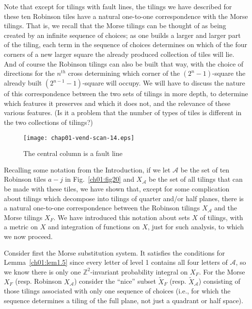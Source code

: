 \documentclass[reqno]{stml-l}
\theoremstyle{plain}
\theoremstyle{definition}
\numberwithin{equation}{chapter}
\begin{document}
Note that except for tilings with fault lines, the tilings we have described for these ten Robinson tiles have a natural one-to-one correspondence with the Morse tilings. That is, we recall that the Morse tilings can be thought of as being created by an infinite sequence of choices; as one builds a larger and larger part of the tiling, each term in the sequence of choices determines on which of the four corners of a new larger square the already produced collection of tiles will lie. And of course the Robinson tilings can also be built that way, with the choice of directions for the $n^{th}$ cross determining which corner of the $(2^{n}-1)$-square the already built $(2^{n-1}-1)$-square will occupy. We will have to discuss the nature of this correspondence between the two sets of tilings in more depth, to determine which features it
preserves and which it does not, and the relevance of these various features. (Is it a problem that the number of types of tiles is different in the two collections of tilings?)

\begin{figure}[h]
\texttt{[image: chap01-vend-scan-14.eps]}
\caption{The central column is a fault line }
\label{ch01:fig27}
\end{figure}

Recalling some notation from the Introduction, if we let $\mathcal{A}$ be the set of ten Robinson tiles $a-j$ in Fig.~\ref{ch01:fig20} and $X_{\mathcal{A}}$ be the set of all tilings that can be made with these tiles, we have shown that, except for some complication about tilings which decompose into tilings of quarter and/or half planes, there is a natural one-to-one correspondence between the Robinson tilings $X_{\mathcal{A}}$ and the Morse tilings $X_{F}$. We have introduced this notation about sets $X$ of tilings, with a metric on $X$ and integration of functions on $X$, just for such analysis, to which we now proceed.

Consider first the Morse substitution system. It satisfies the conditions for Lemma~\ref{ch01:lem1.5} since every letter of level 1 contains all four
letters of $\mathcal{A}$, so we know there is only one $\mathbb{Z}^{2}$-invariant probability integral on $X_{F}$. For the Morse $X_{F}$ (resp. Robinson $X_{\mathcal{A}}$) consider the ``nice'' subset $\tilde{X}_{F}$ (resp. $\tilde{X}_{\mathcal{A}}$) consisting of those tilings associated with only one sequence of choices (i.e., for which the sequence determines a tiling of the full plane, not just a quadrant or half space).
\end{document}
